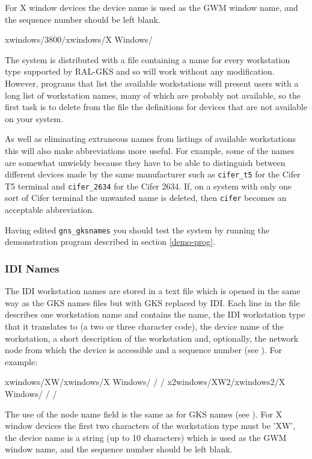 \documentclass[twoside,11pt,nolof]{starlink}
\begin{document}
For X window devices the device name is used as the GWM window name, and the
sequence number should be left blank.
\begin{terminalv}
xwindows/3800/xwindows/X Windows/
\end{terminalv}

The system is distributed with a file containing a name for every workstation
type supported by RAL-GKS and so will work without any modification. However,
programs that list the available workstations will
present users with a long list of workstation names, many of which
are probably not available, so the first task is to delete from the
file the definitions for devices that are not available on your system.

As well as eliminating extraneous names from listings of available workstations
this will also make abbreviations more useful. For example, some of the
names are somewhat unwieldy because they have to be able to distinguish between
different devices made by the same manufacturer such as \texttt{cifer\_t5} for the
Cifer T5 terminal and \texttt{cifer\_2634} for the Cifer 2634. If, on a system with
only one sort of Cifer terminal the unwanted name is deleted, then \texttt{cifer} becomes an acceptable abbreviation.

Having edited \texttt{gns\_gksnames} you should test the system by
running the
demonstration program described in section \ref{demo-prog}.

\subsubsection{IDI Names}

The IDI workstation names are stored in a text file which is opened in the
same way as the GKS names files but with GKS replaced by IDI.
Each line in the file describes one workstation name
and contains the name, the IDI workstation type that it translates to (a two
or three character code), the
device name of the workstation, a short description of the workstation and,
optionally, the network node from which the device is accessible and a
sequence number (see ). For example:
\begin{terminalv}
xwindows/XW/xwindows/X Windows/ / /
x2windows/XW2/xwindows2/X Windows/ / /
\end{terminalv}
The use of the node name field is the same as for GKS names
(see ).
For X window devices the first two characters
of the workstation type must be 'XW', the device name is a string (up to
10 characters) which is used as the GWM window name, and the sequence
number should be left blank.
\end{document}
